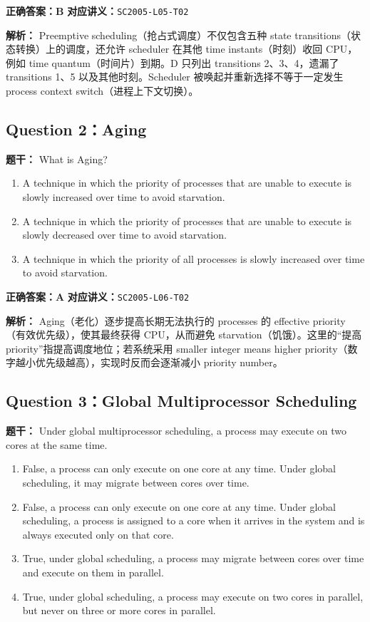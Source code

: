 \documentclass[11pt,a4paper,fontset=fandol]{ctexart}
\renewcommand{\exercisequestion}[2]{%
  \Needspace{5\baselineskip}%
  \subsection{#2}\label{exercise:#1}%
}
\renewenvironment{checkedsolution}
  {\par\nopagebreak[4]\textbf{解析：}\ignorespaces}
  {\par}
\begin{document}
\textbf{正确答案：B}\qquad
\textbf{对应讲义：}\texttt{SC2005-L05-T02}

\begin{checkedsolution}
Preemptive scheduling（抢占式调度）不仅包含五种 state transitions（状态转换）上的调度，还允许 scheduler 在其他 time instants（时刻）收回 CPU，例如 time quantum（时间片）到期。D 只列出 transitions 2、3、4，遗漏了 transitions 1、5 以及其他时刻。Scheduler 被唤起并重新选择不等于一定发生 process context switch（进程上下文切换）。
\end{checkedsolution}

\exercisequestion{SC2005-HW02-Q02}{Question 2：Aging}

\textbf{题干：} What is Aging?

\begin{enumerate}[label=\Alph*.,leftmargin=2.4em]
  \item A technique in which the priority of processes that are unable to execute is slowly increased over time to avoid starvation.
  \item A technique in which the priority of processes that are unable to execute is slowly decreased over time to avoid starvation.
  \item A technique in which the priority of all processes is slowly increased over time to avoid starvation.
\end{enumerate}

\textbf{正确答案：A}\qquad
\textbf{对应讲义：}\texttt{SC2005-L06-T02}

\begin{checkedsolution}
Aging（老化）逐步提高长期无法执行的 processes 的 effective priority（有效优先级），使其最终获得 CPU，从而避免 starvation（饥饿）。这里的“提高 priority”指提高调度地位；若系统采用 smaller integer means higher priority（数字越小优先级越高），实现时反而会逐渐减小 priority number。
\end{checkedsolution}

\exercisequestion{SC2005-HW02-Q03}{Question 3：Global Multiprocessor Scheduling}

\textbf{题干：} Under global multiprocessor scheduling, a process may execute on two cores at the same time.

\begin{enumerate}[label=\Alph*.,leftmargin=2.4em]
  \item False, a process can only execute on one core at any time. Under global scheduling, it may migrate between cores over time.
  \item False, a process can only execute on one core at any time. Under global scheduling, a process is assigned to a core when it arrives in the system and is always executed only on that core.
  \item True, under global scheduling, a process may migrate between cores over time and execute on them in parallel.
  \item True, under global scheduling, a process may execute on two cores in parallel, but never on three or more cores in parallel.
\end{enumerate}
\end{document}
